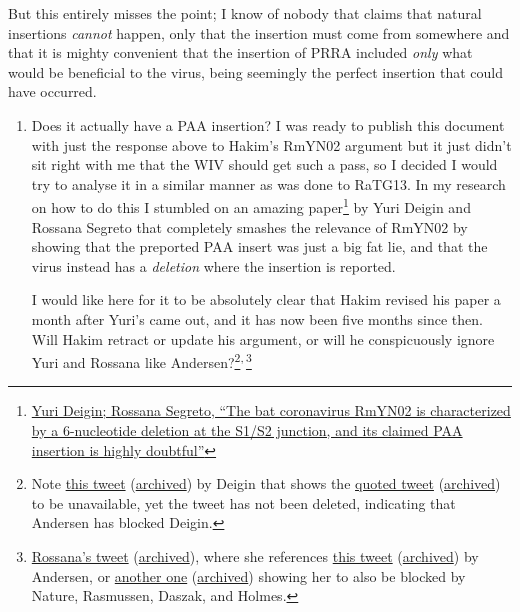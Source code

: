 \documentclass[11pt]{article}
\begin{document}
But this entirely misses the point; I know of nobody that claims that natural insertions \emph{cannot} happen, only that the insertion must come from somewhere and that it is mighty convenient that the insertion of PRRA included \emph{only} what would be beneficial to the virus, being seemingly the perfect insertion that could have occurred.

\begin{enumerate}
\item Does it actually have a PAA insertion?
\label{sec:org6ce51e0}
I was ready to publish this document with just the response above to Hakim's RmYN02 argument but it just didn't sit right with me that the WIV should get such a pass, so I decided I would try to analyse it in a similar manner as was done to RaTG13. In my research on how to do this I stumbled on an amazing paper\footnote{\href{https://www.researchgate.net/publication/346555084\_The\_bat\_coronavirus\_RmYN02\_is\_characterized\_by\_a\_6-nucleotide\_deletion\_at\_the\_S1S2\_junction\_and\_its\_claimed\_PAA\_insertion\_is\_highly\_doubtful}{Yuri Deigin; Rossana Segreto, ``The bat coronavirus RmYN02 is characterized by a 6-nucleotide deletion at the S1/S2 junction, and its claimed PAA insertion is highly doubtful''}} by Yuri Deigin and Rossana Segreto that completely smashes the relevance of RmYN02 by showing that the preported PAA insert was just a big fat lie, and that the virus instead has a \emph{deletion} where the insertion is reported.

I would like here for it to be absolutely clear that Hakim revised his paper a month after Yuri's came out, and it has now been five months since then. Will Hakim retract or update his argument, or will he conspicuously ignore Yuri and Rossana like Andersen?\footnote{Note \href{https://twitter.com/ydeigin/status/1399393464543059973 }{this tweet} (\href{https://archive.is/0MOcE}{archived}) by Deigin that shows the \href{https://twitter.com/K\_G\_Andersen/status/1399128264447172611}{quoted tweet} (\href{https://archive.is/htonK}{archived}) to be unavailable, yet the tweet has not been deleted, indicating that Andersen has blocked Deigin.}\textsuperscript{,}\,\footnote{\href{https://twitter.com/Rossana38510044/status/1391546329348837379}{Rossana's tweet} (\href{https://archive.is/qd7Sb}{archived}), where she references \href{https://twitter.com/K\_G\_Andersen/status/1380521387362713601}{this tweet} (\href{https://archive.is/HLmj9}{archived}) by Andersen, or \href{https://twitter.com/Rossana38510044/status/1379631758296150019}{another one} (\href{https://archive.is/0DYRa}{archived}) showing her to also be blocked by Nature, Rasmussen, Daszak, and Holmes.}


\end{enumerate}
\end{document}
